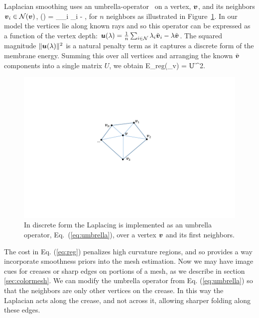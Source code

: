 Laplacian smoothing uses an umbrella-operator~\cite{Kobbelt:1998} on a vertex, $\boldsymbol{v}$, and its neighbors $\boldsymbol{v}_i\in\mathcal{N}(\boldsymbol{v})$,
\beq
{}(\vertex) = \sum_{\vertex_i\in{}} \vertex_i - \vertex,\label{eq:umbrella}
\eeq
for $n$ neighbors as illustrated in Figure~\ref{fig:laplacian}.  In our model the vertices lie along known rays and so this operator can be expressed as a function of the vertex depth: $\boldsymbol{u}(\lambda) = \frac{1}{n}\sum_{i\in\mathcal{N}} \lambda_i \tilde{\boldsymbol{v}}_i - \lambda\tilde{\boldsymbol{v}}$.  The squared magnitude $\|\boldsymbol{u}(\lambda)\|^2$ is a natural penalty term as it captures a discrete form of the membrane energy.  Summing this over all vertices and arranging the known $\tilde{\boldsymbol{v}}$ components into a single matrix $U$, we obtain
\beq
E_{reg}(\vlambda_v) = \| U \vlambda \|^2. \label{eq:reg}
\eeq

\begin{figure}
\begin{center}
   \includegraphics[trim=100 110 140 90,clip,width=0.8\linewidth]{Figures/LaplacianFacets}
\end{center}
   \caption{In discrete form the Laplacing is implemented as an umbrella operator, Eq.~(\ref{eq:umbrella}), over a vertex $\boldsymbol{v}$ and its first neighbors.}
\label{fig:laplacian}
\end{figure}

The cost in Eq. (\ref{eq:reg}) penalizes high curvature regions, and so provides a way incorporate smoothness priors into the mesh estimation.  Now we may have image cues for creases or sharp edges on portions of a mesh, as we describe in section \ref{sec:colormesh}.  We can modify the umbrella operator from Eq. (\ref{eq:umbrella}) so that the neighbors are only other vertices on the crease.  In this way the Laplacian acts along the crease, and not across it, allowing sharper folding along these edges.
 
 
 

